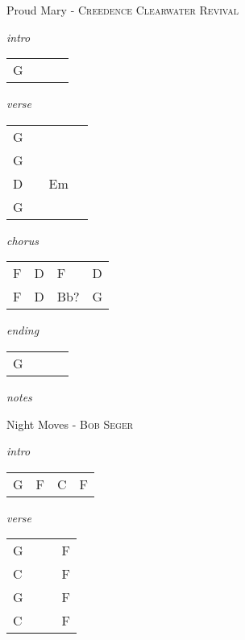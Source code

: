 \documentclass[12pt]{article}
\begin{document}
{\Huge Proud Mary} {\normalsize - \textsc{Creedence Clearwater Revival}}

\huge
\textit{intro}

\begin{tabular}{|P{1.25in}|P{1.25in}|P{1.25in}|P{1.25in}|}
  G &   &   &   \\
\end{tabular}

\textit{verse}

\begin{tabular}{|P{1.25in}|P{1.25in}|P{1.25in}|P{1.25in}|}
  G &   &   &   \\
  G &   &   &   \\
  D &   & Em  &   \\
  G &   &   &   \\
\end{tabular}

\textit{chorus}

\begin{tabular}{|P{1.25in}|P{1.25in}|P{1.25in}|P{1.25in}|}
  F & D  & F  &  D \\
  F & D & Bb? & G  \\
\end{tabular}

\textit{ending}

\begin{tabular}{|P{1.25in}|P{1.25in}|P{1.25in}|P{1.25in}|}
  G &   &   &   \\
\end{tabular}

\textit{notes}

\newpage

{\Huge Night Moves} {\huge - \textsc{Bob Seger}}

\huge
\textit{intro}

\begin{tabular}{|P{1.25in}|P{1.25in}|P{1.25in}|P{1.25in}|}
  G & F & C & F \\
\end{tabular}

\textit{verse}

\begin{tabular}{|P{1.25in}|P{1.25in}|P{1.25in}|P{1.25in}|}
  G &   &   &  F \\
  C &   &   &  F \\
  G &   &   &  F \\
  C &   &   &  F \\
\end{tabular}
\end{document}
